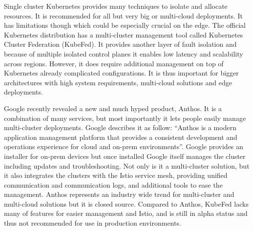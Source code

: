 Single cluster Kubernetes provides many techniques to isolate and allocate resources. It is recommended for all but very big or multi-cloud deployments. It has limitations though which could be especially crucial on the edge. The official Kubernetes distribution has a multi-cluster management tool called Kubernetes Cluster Federation (KubeFed)\cite{kubernetesFederation97:online}. It provides another layer of fault isolation and because of multiple isolated control planes it enables low latency and scalability across regions. However, it does require additional management on top of Kubernetes already complicated configurations. It is thus important for bigger architectures with high system requirements, multi-cloud solutions and edge deployments.

Google recently revealed a new and much hyped product, Anthos\cite{TechnicalAnthosGoogle66:online}. It is a combination of many services, but most importantly it lets people easily manage multi-cluster deployments. Google describes it as follow: ``Anthos is a modern application management platform that provides a consistent development and operations experience for cloud and on-prem environments''\cite{TechnicalAnthosGoogle66:online}. Google provides an installer for on-prem devices but once installed Google itself manages the cluster including updates and troubleshooting. Not only is it a multi-cluster solution, but it also integrates the clusters with the Istio service mesh, providing unified communication and communication logs, and additional tools to ease the management. Anthos represents an industry wide trend for multi-cluster and multi-cloud solutions but it is closed source. Compared to Anthos, KubeFed lacks many of features for easier management and Istio, and is still in alpha status and thus not recommended for use in production environments.\\[0.5mm]





